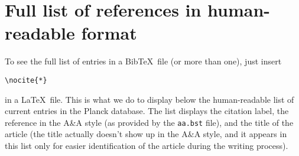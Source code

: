 \documentclass[longauth,traditabstract,referee]{aa}
\begin{document}
\section{Full list of references in human-readable format}

To see the full list of entries in a Bib\TeX\ file (or more than one),
just insert
\begin{verbatim}
\nocite{*}
\end{verbatim}
in a La\TeX\ file.  This is what we do to display below the human-readable list
of current entries in the Planck database. The list displays the citation
label, the reference in the A\&A style (as provided by the \verb=aa.bst= file),
and the title of the article (the title actually doesn't show up in the A\&A
style, and it appears in this list only for easier identification of the
article during the writing process).
\nocite{*}





%

%
\end{document}
